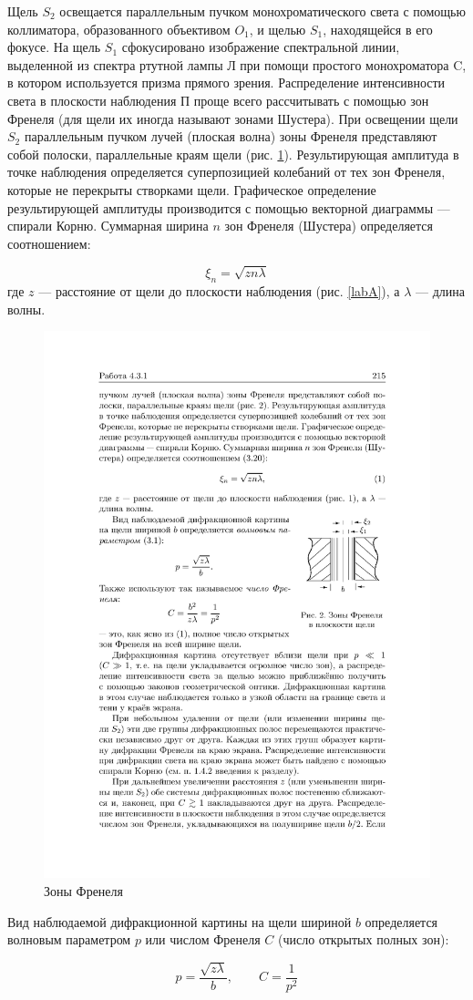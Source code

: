 \documentclass[a4paper, 12pt]{article}%
\begin{document}
	Щель $ S_2 $ освещается параллельным пучком монохроматического света с помощью коллиматора, образованного объективом $ O_1 $, и щелью $S_1$, находящейся в его фокусе. На щель $ S_1 $ сфокусировано изображение спектральной линии, выделенной из спектра ртутной лампы Л при помощи простого монохроматора C, в котором используется призма прямого зрения. Распределение интенсивности света в плоскости наблюдения П проще всего рассчитывать с помощью зон Френеля (для щели их иногда называют зонами Шустера). При освещении щели $ S_2 $ параллельным пучком лучей (плоская волна) зоны Френеля представляют собой полоски, параллельные краям щели (рис. \ref{zone}). Результирующая амплитуда в точке наблюдения определяется суперпозицией колебаний от тех зон Френеля, которые не перекрыты створками щели. Графическое определение результирующей амплитуды производится с помощью векторной диаграммы --- спирали Корню. Суммарная ширина $ n $ зон Френеля (Шустера) определяется соотношением:
	
	\begin{equation}\label{xin}
		\xi_n = \sqrt{zn\lambda}
	\end{equation}
	где $ z $ --- расстояние от щели до плоскости наблюдения (рис. \ref{labA}), а $ \lambda $ --- длина волны.
	
	\begin{figure}[h!]
		\begin{center}
			\includegraphics[width=0.3\linewidth]{zone}
		\end{center}
		\caption{Зоны Френеля}
		\label{zone}
	\end{figure}
	
	Вид наблюдаемой дифракционной картины
	на щели шириной $ b $ определяется волновым параметром $ p $ или числом Френеля $ C $ (число открытых полных зон):
	
	
	\begin{equation}\label{}
		p = \dfrac{\sqrt{z \lambda}}{b}, \qquad C = \dfrac{1}{p^2}
	\end{equation}
	
\end{document}
